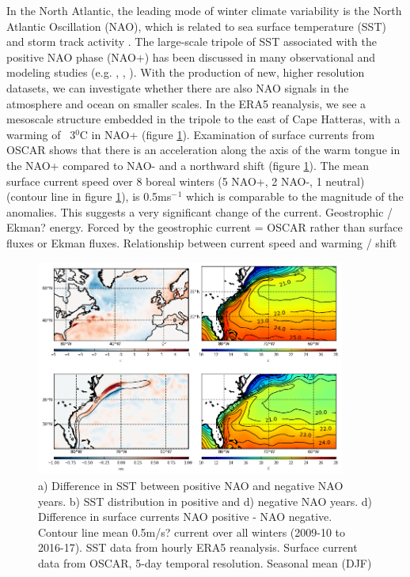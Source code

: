 In the North Atlantic, the leading mode of winter climate variability is the North Atlantic Oscillation (NAO), which is related to sea surface temperature (SST) and storm track activity \citep{vallis2008local}. The large-scale tripole of SST associated with the positive NAO phase (NAO+) has been discussed in many observational and modeling studies (e.g. \citet{czaja2001observations}, \citet{peng2002north}, \citet{visbeck2003ocean}).
With the production of new, higher resolution datasets, we can investigate whether there are also NAO signals in the atmosphere and ocean on smaller scales. In the ERA5 reanalysis, we see a mesoscale structure embedded in the tripole to the east of Cape Hatteras, with a warming of ~3$^{0}$C in NAO+ (figure \ref{fig:subplot1}). Examination of surface currents from OSCAR \citep{Bonjean2002} shows that there is an acceleration along the axis of the warm tongue in the NAO+ compared to NAO- and a northward shift (figure \ref{fig:subplot1}). The mean surface current speed over 8 boreal winters (5 NAO+, 2 NAO-, 1 neutral) (contour line in figure \ref{fig:subplot1}), is 0.5ms$^-$$^1$ which is comparable to the magnitude of the anomalies. This suggests a very significant change of the current. Geostrophic / Ekman? energy. Forced by the geostrophic current = OSCAR rather than surface fluxes or Ekman fluxes. Relationship between current speed and warming / shift


\begin{figure}[h]
	\centering
	\includegraphics[width=24pc]{sst_current_subplot.png}
	\caption{a) Difference in SST between positive NAO and negative NAO years. b) SST distribution  in positive and d) negative NAO years. d) Difference in surface currents NAO positive - NAO negative. Contour line mean 0.5m/s? current over all winters (2009-10 to 2016-17). SST data from hourly ERA5 reanalysis. Surface current data from OSCAR, 5-day temporal resolution. Seasonal mean (DJF)}
	\label{fig:subplot1} 
\end{figure}

